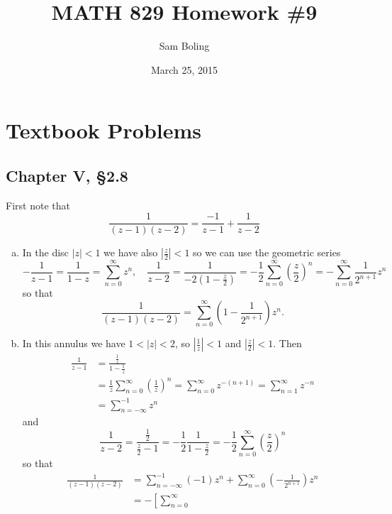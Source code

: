 \documentclass{article}
\title{MATH 829 Homework \#9}
\date{March 25, 2015}
\author{Sam Boling}
\newcounter{Problem}
\begin{document}
\begin{titlepage}
\maketitle
\end{titlepage}

\section{Textbook Problems}
\subsection{Chapter V, \S 2.8}
First note that
$$
  \frac{1}{(z - 1)(z-2)}
= \frac{-1}{z - 1}
+ \frac{1}{z - 2}
$$
\begin{enumerate}[(a)]
  \item{
    In the disc $|z| < 1$ we have also $\left|\frac{z}{2}\right| < 1$ so we can
    use the geometric series
    $$
      -\frac{1}{z - 1}
    =  \frac{1}{1 - z}
    =  \sum_{n=0}^\infty z^n, \quad
      \frac{1}{z - 2}
    = \frac{1}{-2(1 - \frac{z}{2})}
    = -\frac{1}{2}
       \sum_{n=0}^\infty
         \left(\frac{z}{2}\right)^n
    = -\sum_{n=0}^\infty
         \frac{1}{2^{n+1}} z^n
    $$
    so that
    $$
      \frac{1}{(z-1)(z-2)}
    = \sum_{n=0}^\infty
        \left(
          1 - \frac{1}{2^{n+1}}
        \right)
        z^n.
    $$
  }
  \item{
    In this annulus we have $1 < |z| < 2$, so
    $\left|\frac{1}{z}\right| < 1$ and
    $\left|\frac{z}{2}\right| < 1$. Then
    \begin{align*}
       \frac{1}{z - 1}
    &= \frac{\frac{1}{z}}
           {1 - \frac{1}{z}} \\
    &= \frac{1}{z}
       \sum_{n=0}^\infty
         \left(\frac{1}{z}\right)^n
     = \sum_{n=0}^\infty z^{-(n+1)}
     = \sum_{n=1}^\infty z^{-n} \\
    &= \sum_{n=-\infty}^{-1} z^n
    \end{align*}
    and
    $$
      \frac{1}{z - 2}
    = \frac{\frac{1}{2}}
           {\frac{z}{2} - 1}
    = -\frac{1}{2}
       \frac{1}{1 - \frac{z}{2}}
    = -\frac{1}{2}
       \sum_{n=0}^\infty
         \left(\frac{z}{2}\right)^n
    $$
    so that
    \begin{align*}
       \frac{1}{(z-1)(z-2)}
    &= \sum_{n=-\infty}^{-1}
        (-1) z^n
     + \sum_{n=0}^\infty
        \left(-\frac{1}{2^{n+1}}\right) z^n \\
    &= -\left[
          \sum_{n=0}^\infty

\end{align*}}
\end{enumerate}
\end{document}
